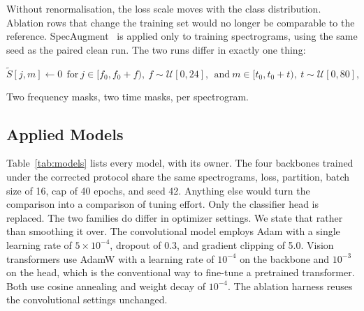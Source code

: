\documentclass[journal,onecolumn]{IEEEtran}
\begin{document}
Without renormalisation, the loss scale moves with the class distribution. Ablation
rows that change the training set would no longer be comparable to the reference.
SpecAugment~\cite{park2019specaugment} is applied only to training spectrograms, using
the same seed as the paired clean run. The two runs differ in exactly one thing:

\begin{equation}
\tilde{S}[j,m] \leftarrow 0 \ \ \text{for}\ j \in [f_0, f_0{+}f),\ f \sim \mathcal{U}[0,24],
\ \ \text{and}\ m \in [t_0, t_0{+}t),\ t \sim \mathcal{U}[0,80],
\label{eq:specaug}
\end{equation}

Two frequency masks, two time masks, per spectrogram.

\subsection{Applied Models}
\label{subsec:models}
Table~\ref{tab:models} lists every model, with its owner. The four backbones trained under the corrected protocol share the same spectrograms, loss, partition, batch size of 16, cap of 40 epochs, and seed 42. Anything else would turn the comparison into a comparison of tuning effort. Only the classifier head is replaced. The two families do differ in optimizer settings. We state that rather than smoothing it over. The convolutional model employs Adam with a single learning rate of $5\times10^{-4}$, dropout of 0.3, and gradient clipping of 5.0. Vision transformers use AdamW with a learning rate of $10^{-4}$ on the backbone and $10^{-3}$ on the head, which is the conventional way to fine-tune a pretrained transformer. Both use cosine annealing and weight decay of $10^{-4}$. The ablation harness reuses the convolutional settings unchanged.
\end{document}
